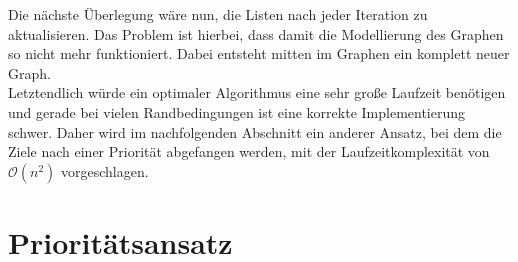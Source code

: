 \documentclass[german,version-2019-11]{uzl-thesis}
\begin{document}
Die nächste Überlegung wäre nun, die Listen nach jeder Iteration zu aktualisieren. Das Problem ist hierbei, dass damit die Modellierung des Graphen so nicht mehr funktioniert. Dabei entsteht mitten im Graphen ein komplett neuer Graph.  \\
Letztendlich würde ein optimaler Algorithmus eine sehr große Laufzeit benötigen und gerade bei vielen Randbedingungen ist eine korrekte Implementierung schwer. Daher wird im nachfolgenden Abschnitt ein anderer Ansatz, bei dem die Ziele nach einer Priorität abgefangen werden, mit der Laufzeitkomplexität von $\mathcal{O}(n^2)$ vorgeschlagen.

\section{Prioritätsansatz}
\end{document}
